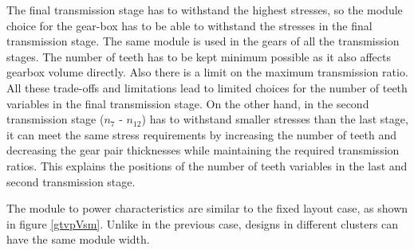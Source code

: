 The final transmission stage has to withstand the highest stresses, so the
module choice for the gear-box has to be able to withstand the stresses in
the final transmission stage. The same module is used in the gears of all
the transmission stages.  The number of teeth has to be kept minimum
possible as it also affects gearbox volume directly. Also there is a limit
on the maximum transmission ratio. All these trade-offs and limitations
lead to limited choices for the number of teeth variables in the final
transmission stage. On the other hand, in the second transmission stage
($n_{7}$ - $n_{12}$) has to withstand smaller stresses than the last stage,
it can meet the same stress requirements by increasing the number of teeth
and decreasing the gear pair thicknesses while maintaining the required
transmission ratios. This explains the positions of the number of teeth
variables in the last and second transmission stage.


The module to power characteristics are similar to the fixed layout case,
as shown in figure \ref{gtvpVsm}. Unlike in the previous case, designs
in different clusters can have the same module width. 


